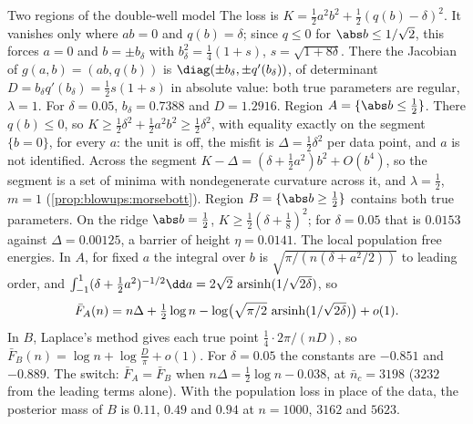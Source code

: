 \begin{refsection}
\begin{computation}{Two regions of the double-well model}\label{comp:phases:doublewell}
\step The loss is $K=\frac12a^2b^2+\frac12(q(b)-\delta)^2$. It vanishes only where $ab=0$ and $q(b)=\delta$; since $q\le0$ for $\abs b\le1/\sqrt2$, this forces $a=0$ and $b=\pm b_\delta$ with $b_\delta^2=\frac14(1+s)$, $s=\sqrt{1+8\delta}$. There the Jacobian of $g(a,b)=(ab,q(b))$ is $\diag(\pm b_\delta,\pm q'(b_\delta))$, of determinant $D=b_\delta q'(b_\delta)=\frac12s(1+s)$ in absolute value: both true parameters are regular, $\lambda=1$. For $\delta=0.05$, $b_\delta=0.7388$ and $D=1.2916$.
\step Region $A=\{\abs b\le\frac12\}$. There $q(b)\le0$, so $K\ge\frac12\delta^2+\frac12a^2b^2\ge\frac12\delta^2$, with equality exactly on the segment $\{b=0\}$, for every $a$: the unit is off, the misfit is $\Delta=\frac12\delta^2$ per data point, and $a$ is not identified. Across the segment $K-\Delta=(\delta+\frac12a^2)b^2+O(b^4)$, so the segment is a set of minima with nondegenerate curvature across it, and $\lambda=\frac12$, $m=1$ (\cref{prop:blowups:morsebott}).
\step Region $B=\{\abs b\ge\frac12\}$ contains both true parameters. On the ridge $\abs b=\frac12$, $K\ge\frac12(\delta+\frac18)^2$; for $\delta=0.05$ that is $0.0153$ against $\Delta=0.00125$, a barrier of height $\eta=0.0141$.
\step The local population free energies. In $A$, for fixed $a$ the integral over $b$ is $\sqrt{\pi/(n(\delta+a^2/2))}$ to leading order, and $\int_{-1}^1(\delta+\frac12a^2)^{-1/2}\dd a=2\sqrt2\,\phasesasinh(1/\sqrt{2\delta})$, so
\[
\bar F_A(n)=n\Delta+\tfrac12\log n-\log\bigl(\sqrt{\pi/2}\,\operatorname{arsinh}(1/\sqrt{2\delta})\bigr)+o(1).
\]
In $B$, Laplace's method gives each true point $\frac14\cdot2\pi/(nD)$, so $\bar F_B(n)=\log n+\log\frac D\pi+o(1)$. For $\delta=0.05$ the constants are $-0.851$ and $-0.889$.
\step The switch: $\bar F_A=\bar F_B$ when $n\Delta=\frac12\log n-0.038$, at $\bar n_c=3198$ ($3232$ from the leading terms alone). With the population loss in place of the data, the posterior mass of $B$ is $0.11$, $0.49$ and $0.94$ at $n=1000$, $3162$ and $5623$.
\end{computation}


\end{refsection}
